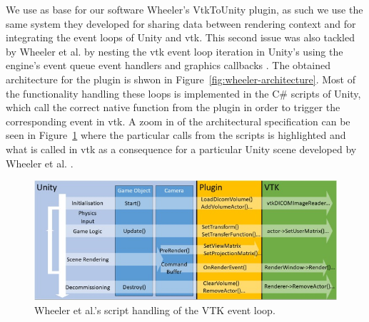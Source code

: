 We use as base for our software Wheeler's VtkToUnity plugin, as such we use the same system they developed for sharing data between rendering context and for integrating the event loops of Unity and \acrshort{vtk}. This second issue was also tackled by Wheeler et al. by nesting the \acrshort{vtk} event loop iteration in Unity's using the engine's event queue event handlers and graphics callbacks \cite{wheeler_virtual_2018}. The obtained architecture for the plugin is shwon in Figure~\ref{fig:wheeler-architecture}. Most of the functionality handling these loops is implemented in the C\# scripts of Unity, which call the correct native function from the plugin in order to trigger the corresponding event in \acrshort{vtk}. A zoom in of the architectural specification can be seen in Figure~\ref{fig:wheeler-architecture-zoomin} where the particular calls from the scripts is highlighted and what is called in \acrshort{vtk} as a consequence for a particular Unity scene developed by Wheeler et al. \cite{wheeler_virtual_2018}.

\begin{figure}
    \centering
    \includegraphics[width=\textwidth]{pictures/wheeler_architecture_zoomin.jpg}
    \caption{Wheeler et al.'s script handling of the VTK event loop.}
    \label{fig:wheeler-architecture-zoomin}
\end{figure}


